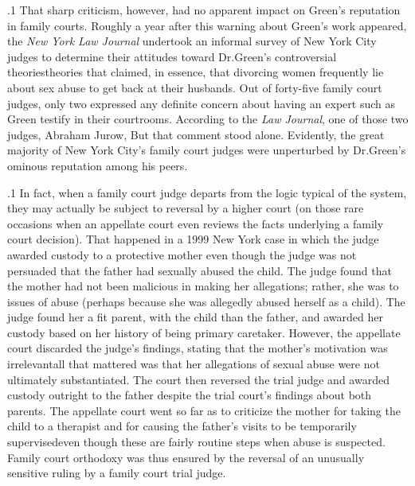 \documentclass[11pt, twoside]{article}
\begin{document}
{\p.1{%
That sharp criticism, however, had no apparent impact on Green’s
reputation in family courts. Roughly a year after this warning about
Green’s work appeared, the \textit{New York Law Journal} undertook an informal survey of New York City judges to determine their attitudes toward
Dr.\@ Green’s controversial theories\mdash{}theories that claimed, in essence,
that divorcing women frequently lie about sex abuse to get back at their
husbands. Out of forty-five family court judges, only two expressed any
definite concern about having an expert such as Green testify in their
courtrooms. According to the \textit{Law Journal}, one of those two judges,
Abraham Jurow,  But that comment stood
alone. Evidently, the great majority of New York City’s family court
judges were unperturbed by Dr.\@ Green’s ominous reputation among his
peers.
}%

\p.1{%
In fact, when a family court judge departs from the  logic typical
of the system, they may actually be subject to reversal by a higher court
(on those rare occasions when an appellate court even reviews the facts
underlying a family court decision). That happened in a 1999 New York
case in which the judge awarded custody to a protective mother even
though the judge was not persuaded that the father had sexually abused
the child. The judge found that the mother had not been malicious
in making her allegations; rather, she was  to issues of
abuse (perhaps because she was allegedly abused herself as a child). The
judge found her a fit parent,  with the child than the father, and awarded her custody based on her history of being primary
caretaker. However, the appellate court discarded the judge’s findings,
stating that the mother’s motivation was irrelevant\mdash{}all that mattered
was that her allegations of sexual abuse were not ultimately substantiated. The court then reversed the trial judge and awarded custody
outright to the father despite the trial court’s findings about both parents. The appellate court went so far as to criticize the mother for taking
the child to a therapist and for causing the father’s visits to be temporarily supervised\mdash{}even though these are fairly routine steps when abuse is
suspected. Family court orthodoxy was thus ensured by the reversal of
an unusually sensitive ruling by a family court trial judge.
}%


}
\end{document}

